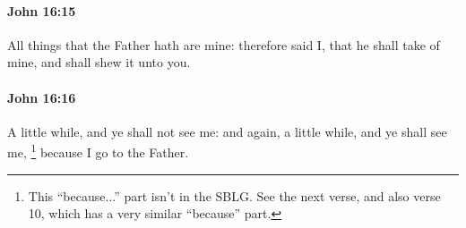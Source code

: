 		\paragraph{John 16:15} %
			\label{JOHN-16-15}

			All things that the Father hath are mine: therefore said I, that he shall take of mine, and shall shew it unto you.

			\begin{framed}
				\scriptsize
				\begin{compactdesc}
					\item[SBLG] 
				\end{compactdesc}
			\end{framed}

		\paragraph{John 16:16} %
			\label{JOHN-16-16}

			A little while, and ye shall not see me: and again, a little while, and ye shall see me,
				\footnote{%
					This ``because...'' part isn't in the SBLG. See the next verse, and also verse 10, which has a very similar ``because'' part.
					}%
			because I go to the Father.

